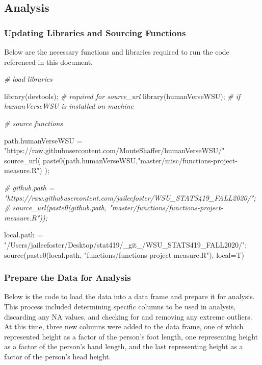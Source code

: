 \documentclass[]{article}
\newenvironment{Shaded}{\begin{snugshade}}{\end{snugshade}}
\newcommand{\AttributeTok}[1]{\textcolor[rgb]{0.77,0.63,0.00}{#1}}
\newcommand{\CommentTok}[1]{\textcolor[rgb]{0.56,0.35,0.01}{\textit{#1}}}
\newcommand{\FunctionTok}[1]{\textcolor[rgb]{0.00,0.00,0.00}{#1}}
\newcommand{\NormalTok}[1]{#1}
\newcommand{\OtherTok}[1]{\textcolor[rgb]{0.56,0.35,0.01}{#1}}
\newcommand{\StringTok}[1]{\textcolor[rgb]{0.31,0.60,0.02}{#1}}
\begin{document}
\newpage

\subsection{Analysis}
\subsubsection{Updating Libraries and Sourcing Functions}

Below are the necessary functions and libraries required to run the code
referenced in this document.

\begin{Shaded}
\begin{Highlighting}[]
\CommentTok{\# load libraries}

\FunctionTok{library}\NormalTok{(devtools);       }\CommentTok{\# required for source\_url}
\FunctionTok{library}\NormalTok{(humanVerseWSU);  }\CommentTok{\# if humanVerseWSU is installed on machine}

\CommentTok{\# source functions }

\NormalTok{path.humanVerseWSU }\OtherTok{=} \StringTok{"https://raw.githubusercontent.com/MonteShaffer/humanVerseWSU/"}
\FunctionTok{source\_url}\NormalTok{( }\FunctionTok{paste0}\NormalTok{(path.humanVerseWSU,}\StringTok{"master/misc/functions{-}project{-}measure.R"}\NormalTok{) );}

\CommentTok{\# github.path = "https://raw.githubusercontent.com/jaileefoster/WSU\_STATS419\_FALL2020/";}
\CommentTok{\# source\_url(paste0(github.path, "master/functions/functions{-}project{-}measure.R"));}

\NormalTok{local.path }\OtherTok{=} \StringTok{"/Users/jaileefoster/Desktop/stat419/\_git\_/WSU\_STATS419\_FALL2020/"}\NormalTok{;}
\FunctionTok{source}\NormalTok{(}\FunctionTok{paste0}\NormalTok{(local.path, }\StringTok{"functions/functions{-}project{-}measure.R"}\NormalTok{), }\AttributeTok{local=}\NormalTok{T)}
\end{Highlighting}
\end{Shaded}

\subsubsection{Prepare the Data for Analysis}

Below is the code to load the data into a data frame and prepare it for
analysis. This process included determining specific columns to be used
in analysis, discarding any NA values, and checking for and removing any
extreme outliers. At this time, three new columns were added to the data
frame, one of which represented height as a factor of the person's foot
length, one representing height as a factor of the person's hand length,
and the last representing height as a factor of the person's head
height.
\end{document}

